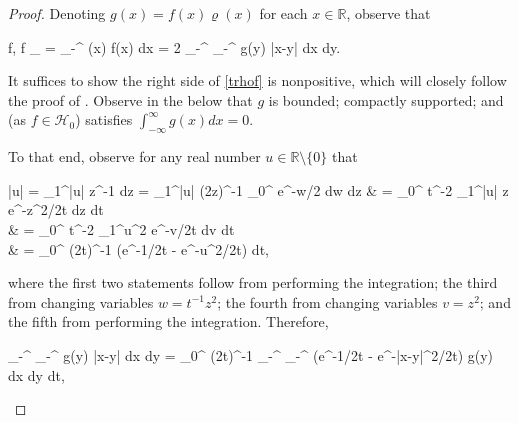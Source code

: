 \documentclass{amsart}
\numberwithin{equation}{section}
\theoremstyle{remark}
\theoremstyle{definition}
\begin{document}
	\begin{proof}
		
		Denoting $g(x) = f(x) \varrho (x)$ for each $x \in \mathbb{R}$, observe that 
		\begin{flalign}
			\label{trhof}
			\langle {} \bm{\varrho} f, f \rangle_{\varrho} = \displaystyle\int_{-\infty}^{\infty}  \varrho (x)  \bm{\varrho} f(x) dx = 2 \displaystyle\int_{-\infty}^{\infty} \displaystyle\int_{-\infty}^{\infty}  g(y) \log |x-y| dx dy.
		\end{flalign}
		
		\noindent It suffices to show the right side of \eqref{trhof} is nonpositive, which will closely follow the proof of \cite[Lemma 2.6.2(d)]{IRM}. Observe in the below that $g$ is bounded; compactly supported; and (as $f \in \mathcal{H}_0$) satisfies $\int_{-\infty}^{\infty} g(x) dx = 0$. 
		
		To that end, observe for any real number $u \in \mathbb{R} \setminus \{ 0 \}$ that  
		\begin{flalign*}
			\log |u| = \displaystyle\int_1^{|u|} z^{-1} dz = \displaystyle\int_{1}^{|u|} (2z)^{-1} \displaystyle\int_0^{\infty} e^{-w/2} dw dz & = \displaystyle{}  \displaystyle\int_0^{\infty} t^{-2} \displaystyle\int_1^{|u|}  z e^{-z^2/2t} dz dt \\ 
			&  = \displaystyle{} \displaystyle\int_0^{\infty} t^{-2} \displaystyle\int_1^{u^2} e^{-v/2t} dv dt \\
			&  = \displaystyle\int_0^{\infty} (2t)^{-1} \cdot (e^{-1/2t} - e^{-u^2/2t}) dt,
		\end{flalign*} 
		
		\noindent where the first two statements follow from performing the integration; the third from changing variables $w = t^{-1} z^2$; the fourth from changing variables $v = z^2$; and the fifth from performing the integration. Therefore, 
		\begin{flalign*}
			\displaystyle\int_{-\infty}^{\infty} \displaystyle\int_{-\infty}^{\infty}  g(y) \log |x-y| dx dy = \displaystyle\int_0^{\infty} (2t)^{-1} \displaystyle\int_{-\infty}^{\infty} \displaystyle\int_{-\infty}^{\infty} (e^{-1/2t} - e^{-|x-y|^2/2t}) \cdot {} g(y) dx dy dt,
		\end{flalign*} 
		

\end{proof}
\end{document}
